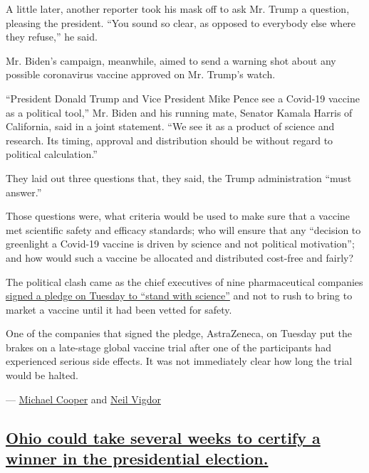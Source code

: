 A little later, another reporter took his mask off to ask Mr. Trump a
question, pleasing the president. ``You sound so clear, as opposed to
everybody else where they refuse,'' he said.

Mr. Biden's campaign, meanwhile, aimed to send a warning shot about any
possible coronavirus vaccine approved on Mr. Trump's watch.

``President Donald Trump and Vice President Mike Pence see a Covid-19
vaccine as a political tool,'' Mr. Biden and his running mate, Senator
Kamala Harris of California, said in a joint statement. ``We see it as a
product of science and research. Its timing, approval and distribution
should be without regard to political calculation.''

They laid out three questions that, they said, the Trump administration
``must answer.''

Those questions were, what criteria would be used to make sure that a
vaccine met scientific safety and efficacy standards; who will ensure
that any ``decision to greenlight a Covid-19 vaccine is driven by
science and not political motivation''; and how would such a vaccine be
allocated and distributed cost-free and fairly?

The political clash came as the chief executives of nine pharmaceutical
companies
\href{https://www.pfizer.com/news/press-release/press-release-detail/biopharma-leaders-unite-stand-science}{signed
a pledge on Tuesday to ``stand with science''} and not to rush to bring
to market a vaccine until it had been vetted for safety.

One of the companies that signed the pledge, AstraZeneca, on Tuesday put
the brakes on a late-stage global vaccine trial after one of the
participants had experienced serious side effects. It was not
immediately clear how long the trial would be halted.

--- \href{https://www.nytimes3xbfgragh.onion/by/michael-cooper}{Michael
Cooper} and
\href{https://www.nytimes3xbfgragh.onion/by/neil-vigdor}{Neil Vigdor}

\hypertarget{ohio-could-take-several-weeks-to-certify-a-winner-in-the-presidential-election}{%
\subsection{\texorpdfstring{\protect\hyperlink{ohio-could-take-several-weeks-to-certify-a-winner-in-the-presidential-election}{Ohio
could take several weeks to certify a winner in the presidential
election.}}{Ohio could take several weeks to certify a winner in the presidential election.}}\label{ohio-could-take-several-weeks-to-certify-a-winner-in-the-presidential-election}}

